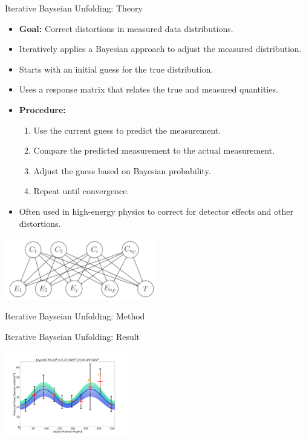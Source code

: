 \documentclass[aspectratio=169]{beamer}
\begin{document}
\begin{frame}{Iterative Bayseian Unfolding: Theory}

 \begin{itemize}
        \item \textbf{Goal:} Correct distortions in measured data distributions.
        \item Iteratively applies a Bayesian approach to adjust the measured distribution.
        \item Starts with an initial guess for the true distribution.
        \item Uses a response matrix that relates the true and measured quantities.
        \item \textbf{Procedure:}
            \begin{enumerate}
                \item Use the current guess to predict the measurement.
                \item Compare the predicted measurement to the actual measurement.
                \item Adjust the guess based on Bayesian probability.
                \item Repeat until convergence.
            \end{enumerate}
        \item Often used in high-energy physics to correct for detector effects and other distortions.
    \end{itemize}
    \includegraphics[width=0.5\textwidth]{defense/ibu/theory.png} %
\end{frame}

\begin{frame}{Iterative Bayseian Unfolding: Method}


\end{frame}

\begin{frame}{Iterative Bayseian Unfolding: Result}

\includegraphics[width=0.4\textwidth]{defense/sample_prelim_xsec.png}

\end{frame}
\end{document}
